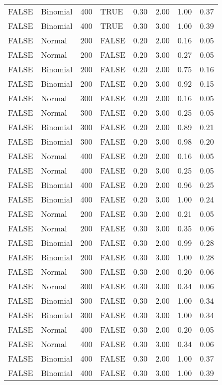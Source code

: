 \begin{longtable}{llrlrrrr}
  FALSE & Binomial & 400 & TRUE & 0.30 & 2.00 & 1.00 & 0.37 \\ 
  FALSE & Binomial & 400 & TRUE & 0.30 & 3.00 & 1.00 & 0.39 \\ 
  FALSE & Normal & 200 & FALSE & 0.20 & 2.00 & 0.16 & 0.05 \\ 
  FALSE & Normal & 200 & FALSE & 0.20 & 3.00 & 0.27 & 0.05 \\ 
  FALSE & Binomial & 200 & FALSE & 0.20 & 2.00 & 0.75 & 0.16 \\ 
  FALSE & Binomial & 200 & FALSE & 0.20 & 3.00 & 0.92 & 0.15 \\ 
  FALSE & Normal & 300 & FALSE & 0.20 & 2.00 & 0.16 & 0.05 \\ 
  FALSE & Normal & 300 & FALSE & 0.20 & 3.00 & 0.25 & 0.05 \\ 
  FALSE & Binomial & 300 & FALSE & 0.20 & 2.00 & 0.89 & 0.21 \\ 
  FALSE & Binomial & 300 & FALSE & 0.20 & 3.00 & 0.98 & 0.20 \\ 
  FALSE & Normal & 400 & FALSE & 0.20 & 2.00 & 0.16 & 0.05 \\ 
  FALSE & Normal & 400 & FALSE & 0.20 & 3.00 & 0.25 & 0.05 \\ 
  FALSE & Binomial & 400 & FALSE & 0.20 & 2.00 & 0.96 & 0.25 \\ 
  FALSE & Binomial & 400 & FALSE & 0.20 & 3.00 & 1.00 & 0.24 \\ 
  FALSE & Normal & 200 & FALSE & 0.30 & 2.00 & 0.21 & 0.05 \\ 
  FALSE & Normal & 200 & FALSE & 0.30 & 3.00 & 0.35 & 0.06 \\ 
  FALSE & Binomial & 200 & FALSE & 0.30 & 2.00 & 0.99 & 0.28 \\ 
  FALSE & Binomial & 200 & FALSE & 0.30 & 3.00 & 1.00 & 0.28 \\ 
  FALSE & Normal & 300 & FALSE & 0.30 & 2.00 & 0.20 & 0.06 \\ 
  FALSE & Normal & 300 & FALSE & 0.30 & 3.00 & 0.34 & 0.06 \\ 
  FALSE & Binomial & 300 & FALSE & 0.30 & 2.00 & 1.00 & 0.34 \\ 
  FALSE & Binomial & 300 & FALSE & 0.30 & 3.00 & 1.00 & 0.34 \\ 
  FALSE & Normal & 400 & FALSE & 0.30 & 2.00 & 0.20 & 0.05 \\ 
  FALSE & Normal & 400 & FALSE & 0.30 & 3.00 & 0.34 & 0.06 \\ 
  FALSE & Binomial & 400 & FALSE & 0.30 & 2.00 & 1.00 & 0.37 \\ 
  FALSE & Binomial & 400 & FALSE & 0.30 & 3.00 & 1.00 & 0.39 \\ 

\end{longtable}
